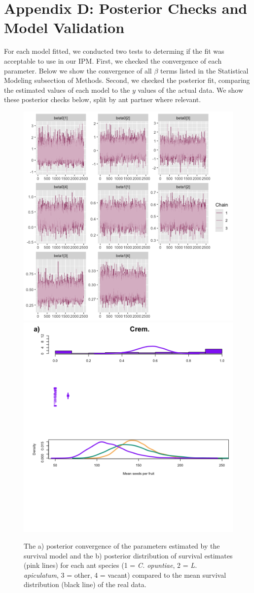 \documentclass[11pt]{article}
\begin{document}
\section*{Appendix D: Posterior Checks and Model Validation}
For each model fitted, we conducted two tests to determing if the fit was acceptable to use in our IPM. 
First, we checked the convergence of each parameter.
Below we show the convergence of all $\beta$ terms listed in the Statistical Modeling subsection of Methods.
Second, we checked the posterior fit, comparing the estimated values of each model to the $y$ values of the actual data.
We show these posterior checks below, split by ant partner where relevant.
\begin{figure}
\includegraphics[width = 0.45\linewidth]{Figures/surv_conv.png}
\includegraphics[width=0.45\linewidth]{Figures/surv_post.png}
\caption{The a) posterior convergence of the parameters estimated by the survival model and the b) posterior distribution of survival estimates (pink lines) for each ant species (1 = \textit{C. opuntiae}, 2 = \textit{L. apiculatum}, 3 = other, 4 = vacant) compared to the mean survival distribution (black line) of the real data.}
\label{fig:Surv_post}
\end{figure}
\end{document}
